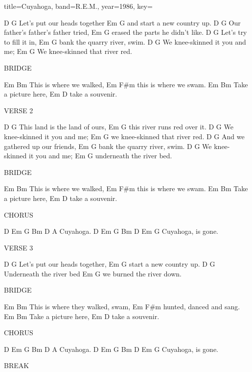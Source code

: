 \documentclass{skrul-leadsheet}
\begin{document}
\begin{song}[transpose-capo=true]{title={Cuyahoga}, band={R.E.M.}, year={1986}, key={}}

      D               G
Let's put our heads together
    Em          G
and start a new country up.
    D                 G
Our father's father's father tried,
 Em                 G
erased the parts he didn't like.
      D                  G
Let's try to fill it in,
Em              G
bank the quarry river, swim.
D                  G
We knee-skinned it you and me;
Em                   G
We knee-skinned that river red.
 
BRIDGE
 
Em               Bm
This is where we walked,
Em               F#m
this is where we swam.
Em                  Bm
Take a picture here,
Em               D
take a souvenir.
 
VERSE 2
 
     D                   G
This land is the land of ours,
     Em             G
this river runs red over it.
D                  G
We knee-skinned it you and me;
Em                   G
we knee-skinned that river red.
       D               G
And we gathered up our friends,
Em              G
bank the quarry river, swim.
D                  G
We knee-skinned it you and me;
Em             G
underneath the river bed.
 
BRIDGE
 
Em               Bm
This is where we walked,
Em               F#m
this is where we swam.
Em                  Bm
Take a picture here,
Em               D
take a souvenir.
 
CHORUS
 
D   Em  G Bm     D      A
    Cuyahoga.
D   Em  G Bm     D  Em  G
    Cuyahoga, is gone.
 
VERSE 3
 
      D             G
Let's put our heads together,
Em          G
start a new country up.
D              G
Underneath the river bed
   Em                     G
we burned the river down.
 
BRIDGE
 
Em                 Bm
This is where they walked, swam,
Em                 F#m
hunted, danced and sang.
Em                   Bm
Take a picture here,
Em               D
take a souvenir.
 
CHORUS
 
D   Em  G Bm     D      A
    Cuyahoga.
D   Em  G Bm     D  Em  G
    Cuyahoga, is gone.
 
BREAK
 

\end{song}
\end{document}
